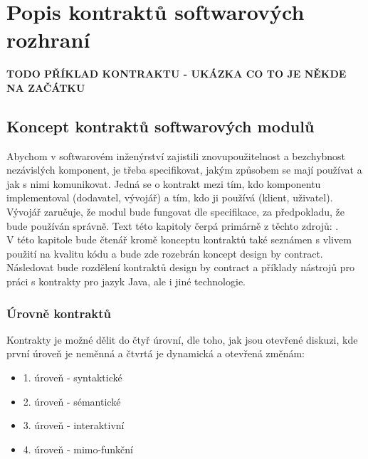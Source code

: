 \chapter{Popis kontraktů softwarových rozhraní}

	\textbf{TODO PŘÍKLAD KONTRAKTU - UKÁZKA CO TO JE NĚKDE NA ZAČÁTKU}

	\section{Koncept kontraktů softwarových modulů}	
		Abychom v softwarovém inženýrství zajistili znovupoužitelnost a bezchybnost nezávislých komponent, je třeba specifikovat, jakým způsobem se mají používat a jak s nimi komunikovat. Jedná se o kontrakt mezi tím, kdo komponentu implementoval (dodavatel, vývojář) a tím, kdo ji používá (klient, uživatel). Vývojář zaručuje, že modul bude fungovat dle specifikace, za předpokladu, že bude používán správně. Text této kapitoly čerpá primárně z těchto zdrojů: \cite{contractsInWild}\cite{applyingDbc}\cite{ooswConstruction}\cite{contractAware}.\\		
		
		V této kapitole bude čtenář kromě konceptu kontraktů také seznámen s vlivem použití na kvalitu kódu a bude zde rozebrán koncept design by contract. Následovat bude rozdělení kontraktů design by contract a příklady nástrojů pro práci s kontrakty pro jazyk Java, ale i jiné technologie.\\
		
		\subsection{Úrovně kontraktů}		
			Kontrakty je možné dělit do čtyř úrovní, dle toho, jak jsou otevřené diskuzi, kde první úroveň je neměnná a čtvrtá je dynamická a otevřená změnám: 
			\begin{itemize}
				\item 1. úroveň - syntaktické
				\item 2. úroveň - sémantické
				\item 3. úroveň - interaktivní
				\item 4. úroveň - mimo-funkční
			\end{itemize}
		
